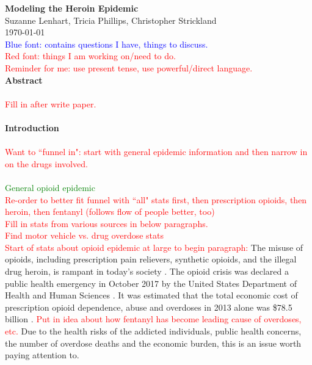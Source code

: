 \documentclass[12pt]{article}
\begin{document}
\textbf{\large{Modeling the Heroin Epidemic}} \\
Suzanne Lenhart, Tricia Phillips, Christopher Strickland \\
\today \\

\textcolor{blue}{Blue font: contains questions I have, things to discuss.} \\
\textcolor{red}{Red font: things I am working on/need to do.} \\ 
\textcolor{red}{Reminder for me: use present tense, use powerful/direct language.} \\
\textbf{Abstract} \\ \\
\textcolor{red}{Fill in after write paper.} \\ \\
\textbf{Introduction} \\ \\
\textcolor{red}{Want to ``funnel in": start with general epidemic information and then narrow in on the drugs involved.}\\ \\
\textcolor{green}{General opioid epidemic} \\
\textcolor{red}{Re-order to better fit funnel with ``all" stats first, then prescription opioids, then heroin, then fentanyl (follows flow of people better, too)} \\
\textcolor{red}{Fill in stats from various sources in below paragraphs.} \\
\textcolor{red}{Find motor vehicle vs. drug overdose stats} \\


\textcolor{red}{Start of stats about opioid epidemic at large to begin paragraph:} The misuse of opioids, including prescription pain relievers, synthetic opioids, and the illegal drug heroin, is rampant in today's society \cite{NIH2}. The opioid crisis was declared a public health emergency in October 2017 by the United States Department of Health and Human Sciences \cite{HHS1}. It was estimated that the total economic cost of prescription opioid dependence, abuse and overdoses in 2013 alone was \$78.5 billion \cite{Florence}. \textcolor{red}{Put in idea about how fentanyl has become leading cause of overdoses, etc.} Due to the health risks of the addicted individuals, public health concerns, the number of overdose deaths and the economic burden, this is an issue worth paying attention to.
\end{document}
